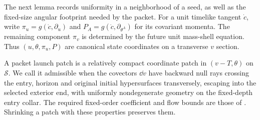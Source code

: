 The next lemma records uniformity in a neighborhood of a seed,
as well as the fixed-size angular footprint needed by the packet.
For a unit timelike tangent $\dot c$, write
$\pi_u=g(\dot c,\partial_u)$ and
$P_A=g(\dot c,\partial_{\theta^A})$ for its covariant momenta.
The remaining component $\pi_v$ is determined by the future unit
mass-shell equation. Thus $(u,\theta,\pi_u,P)$ are canonical state
coordinates on a transverse $v$ section.

A packet launch patch is a relatively compact coordinate patch in
$(v-T,\theta)$ on $\mathcal S$. We call it admissible when the
covectors $\dd v$ have backward null rays crossing the entry, horizon
and original initial hypersurfaces transversely, escaping into the
selected exterior end, with uniformly nondegenerate geometry on the
fixed-depth entry collar. The required fixed-order coefficient and
flow bounds are those of
\cite[,
]{KerrCTwo}.
Shrinking a patch with these properties preserves them.

